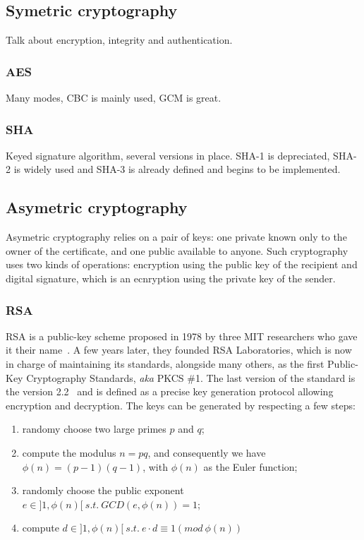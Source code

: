 \subsection{Symetric cryptography}
Talk about encryption, integrity and authentication.


\subsubsection{AES}
Many modes, CBC is mainly used, GCM is great.

\subsubsection{SHA}
Keyed signature algorithm, several versions in place. SHA-1 is depreciated, SHA-2 is widely used and SHA-3 is already defined and begins to be implemented.

\subsection{Asymetric cryptography}
Asymetric cryptography relies on a pair of keys: one private known only to the owner of the certificate, and one public available to anyone.
Such cryptography uses two kinds of operations: encryption using the public key of the recipient and digital signature, which is an ecnryption using the private key of the sender.

\subsubsection{RSA}
RSA is a public-key scheme proposed in 1978 by three MIT researchers who gave it their name~\cite{Rivest:1978:MOD:359340.359342}.
A few years later, they founded RSA Laboratories, which is now in charge of maintaining its standards, alongside many others, as the first Public-Key Cryptography Standards, \textit{aka} PKCS \#1.
The last version of the standard is the version 2.2~\cite{pkcs1} and is defined as a precise key generation protocol allowing encryption and decryption.
The keys can be generated by respecting a few steps:
\begin{enumerate}
	\item randomy choose two large primes $p$ and $q$;
	\item compute the modulus $n = p q$, and consequently we have $\phi(n) = (p-1)(q-1)$, with $\phi(n)$ as the Euler function;
	\item randomly choose the public exponent $e \in ]1,\phi(n)[\ s.t.\ GCD(e,\phi(n)) = 1$;
	\item compute $d \in ]1,\phi(n)[\ s.t.\ e \cdot d \equiv 1 (mod\ \phi(n))$
\end{enumerate}

